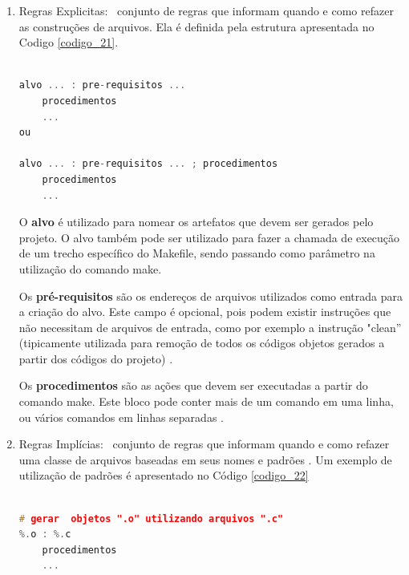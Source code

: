 \begin{enumerate}

    \item Regras Explicitas: \
        conjunto de regras que informam quando e como refazer as construções
         de arquivos. Ela é definida pela estrutura apresentada no Codigo \ref{codigo_21}.


        \begin{lstlisting}[language=C++,frame=single,captionpos=b,caption={
                                     			Regras explicitas Makefile},
                                                        label=codigo_21]

alvo ... : pre-requisitos ... 
    procedimentos
	...
ou 

alvo ... : pre-requisitos ... ; procedimentos
    procedimentos
    ...

        \end{lstlisting}


 O \textbf{alvo} é utilizado para nomear os artefatos que devem ser gerados pelo projeto.
 O alvo também pode ser utilizado para fazer a chamada de execução de um trecho
 específico do Makefile,  sendo passando como parâmetro na utilização do comando
 make.

 Os \textbf{pré-requisitos} são os endereços de arquivos utilizados como entrada para a 
criação do alvo. Este campo é opcional, pois podem existir instruções que não
 necessitam de arquivos de entrada, como por exemplo a instrução "clean”
 (tipicamente utilizada para remoção de todos os códigos objetos gerados a partir
 dos códigos do projeto) \cite{ref47}.

Os \textbf{procedimentos} são as ações que devem ser executadas a partir do comando make.
Este bloco pode conter mais de um comando em uma linha, ou  vários comandos em
 linhas separadas \cite{ref47}.

    \item Regras Implícias: \
 conjunto de regras que informam quando e como refazer uma classe de arquivos
 baseadas em seus nomes e padrões \cite{ref48}. Um exemplo de utilização de 
 padrões é apresentado no Código \ref{codigo_22} \cite{ref49}
        
    \begin{lstlisting}[language=C++,frame=single,captionpos=b,caption={ 
                          Exemplo de utilização de padrões no Makefile},
                                                        label=codigo_22]

# gerar  objetos ".o" utilizando arquivos ".c"
%.o : %.c
    procedimentos
    ...


\end{lstlisting}
\end{enumerate}
